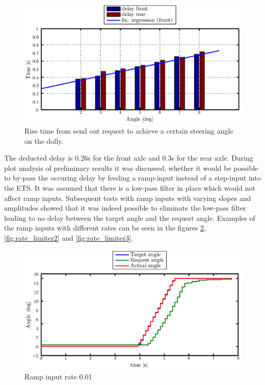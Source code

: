 \documentclass[ExampleMasters.tex]{subfiles}
\begin{document}
\begin{figure}[!hbt]
	\centering
	\includegraphics[width=1\linewidth]{figures/delay_testing_lin_interpolation}
	\caption{Rise time from send out request to achieve a certain steering angle on the dolly.}
	\label{fig:delay_testing_lin_interpolation}
\end{figure}
The deducted delay is 0.26s for the front axle and 0.3s for the rear axle.
During plot analysis of preliminary results it was discussed, whether it would be possible to by-pass the occuring delay by feeding a ramp-input instead of a step-input into the \gls{ETS}. It was assumed that there is a low-pass filter in place which would not affect ramp inputs. Subsequent tests with ramp inputs with varying slopes and amplitudes showed that it was indeed possible to eliminate the low-pass filter leading to no delay between the target angle and the request angle. Examples of the ramp inputs with different rates can be seen in the figures \ref{fig:rate_limiter1}, \ref{fig:rate_limiter2} and \ref{fig:rate_limiter3}.\\
\begin{figure}[!htb]
	\centering
	\includegraphics[width=1\linewidth]{figures/rate_limiter1}
	\caption{Ramp input rate 0.01}
	
	\label{fig:rate_limiter1}
\end{figure}
\end{document}
